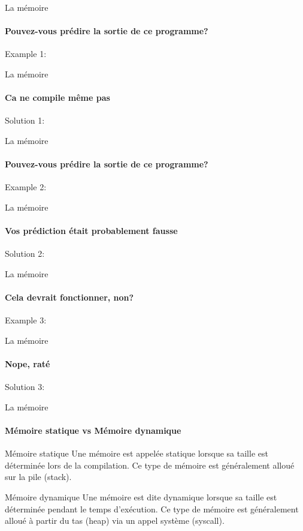 

  	\begin{frame}{La mémoire}
  		\framesubtitle{Pouvez-vous prédire la sortie de ce programme?}
  		Example 1:
  		\dataDemoOne
  	\end{frame}
  	\begin{frame}{La mémoire}
  		\framesubtitle{Ca ne compile même pas}
  		Solution 1:
  		\dataDemoOneSolution
  	\end{frame}
  
  	\begin{frame}{La mémoire}
  		\framesubtitle{Pouvez-vous prédire la sortie de ce programme?}
  		Example 2:
  		\dataDemoTwo
  	\end{frame}
  	\begin{frame}{La mémoire}
  		\framesubtitle{Vos prédiction était probablement fausse}
  		Solution 2:
  		\dataDemoTwoSolution
  	\end{frame}
  
  	\begin{frame}{La mémoire}
  		\framesubtitle{Cela devrait fonctionner, non?}
  		Example 3:
  		\dataDemoThree
  	\end{frame}
  	
  	\begin{frame}{La mémoire}
  		\framesubtitle{Nope, raté}
  		Solution 3:
  		\dataDemoThreeSolution
  	\end{frame}
   	
  	\begin{frame}{La mémoire}
  		\framesubtitle{Mémoire statique vs Mémoire dynamique}
  		\begin{block}{Mémoire statique}
  			Une mémoire est appelée \alert{statique } lorsque sa taille est déterminée lors de la \alert{compilation}. Ce type de mémoire est généralement alloué sur la \alert{pile} (stack).
  		\end{block}
  		\begin{block}{Mémoire dynamique}
  			Une mémoire est dite \alert{dynamique} lorsque sa taille est déterminée pendant le temps \alert{d'exécution}. Ce type de mémoire est généralement alloué à partir du \alert{tas} (heap) via un appel système (syscall).
  		\end{block}
  	\end{frame} 	

